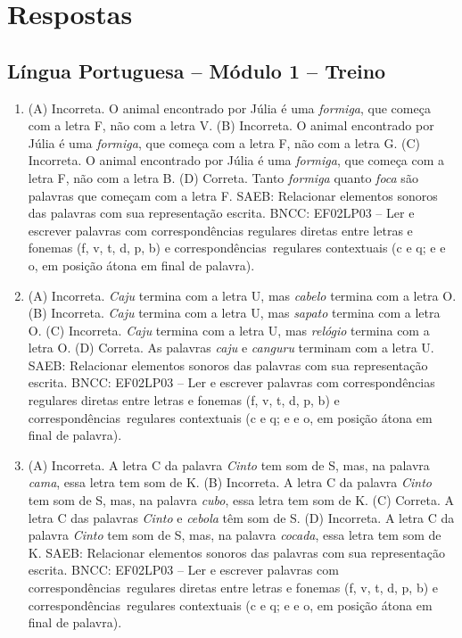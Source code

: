 \chapter{Respostas}
\pagestyle{plain}
\footnotesize

\pagecolor{gray!40}

\section*{Língua Portuguesa – Módulo 1 – Treino}

\begin{enumerate}
\item
(A) Incorreta. O animal encontrado por Júlia é uma \textit{formiga}, 
que começa com a letra F, não com a letra V.
(B) Incorreta. O animal encontrado por Júlia é uma \textit{formiga}, 
que começa com a letra F, não com a letra G.
(C) Incorreta. O animal encontrado por Júlia é uma \textit{formiga}, 
que começa com a letra F, não com a letra B. 
(D) Correta. Tanto \textit{formiga} quanto \textit{foca} são palavras
que começam com a letra F.
SAEB: Relacionar elementos sonoros das palavras com sua
representação escrita.
BNCC: EF02LP03 -- Ler e escrever palavras com correspondências
regulares diretas entre letras e fonemas (f, v, t, d, p, b) e
correspondências~regulares contextuais (c e q; e e o, em posição átona
em final de palavra).

\item
(A) Incorreta. \textit{Caju} termina com a letra U, mas \textit{cabelo} termina com a letra O.
(B) Incorreta. \textit{Caju} termina com a letra U, mas \textit{sapato} termina com a letra O.
(C) Incorreta. \textit{Caju} termina com a letra U, mas \textit{relógio} termina com a letra O.
(D) Correta. As palavras \textit{caju} e \textit{canguru} terminam com a letra U.
SAEB: Relacionar elementos sonoros das palavras com sua
representação escrita.
BNCC: EF02LP03 -- Ler e escrever palavras com correspondências
regulares diretas entre letras e fonemas (f, v, t, d, p, b) e
correspondências~regulares contextuais (c e q; e e o, em posição átona
em final de palavra).

\item
(A) Incorreta. A letra C da palavra \textit{Cinto} tem som de S, mas,
na palavra \textit{cama}, essa letra tem som de K. 
(B) Incorreta. A letra C da palavra \textit{Cinto} tem som de S, mas,
na palavra \textit{cubo}, essa letra tem som de K.
(C) Correta. A letra C das palavras \textit{Cinto} e \textit{cebola}
têm som de S.
(D) Incorreta. A letra C da palavra \textit{Cinto} tem som de S, mas,
na palavra \textit{cocada}, essa letra tem som de K.
SAEB: Relacionar elementos sonoros das palavras com sua
representação escrita.
BNCC: EF02LP03 -- Ler e
escrever palavras com correspondências~regulares diretas entre letras e
fonemas (f, v, t, d, p, b) e correspondências~regulares contextuais (c e
q; e e o, em posição átona em final de palavra).
\end{enumerate}

